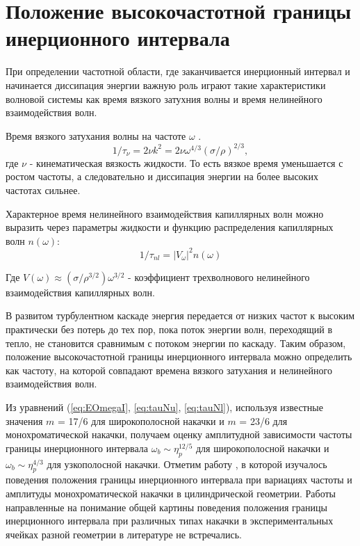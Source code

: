 \section{Положение высокочастотной границы инерционного интервала}\label{subsect_hiFreqBound}

При определении частотной области, где заканчивается инерционный интервал и начинается диссипация энергии важную роль играют такие характеристики волновой системы как время вязкого затухния волны и время нелинейного взаимодействия волн.

Время вязкого затухания волны на частоте $\omega$ \cite[стр. 135]{land}.
\begin{equation}
\label{eq:tauNu}
1/\tau_\nu = 2\nu k^2 = 2 \nu \omega^{4/3}(\sigma/\rho)^{2/3},
\end{equation}
где $\nu$ - кинематическая вязкость жидкости.
То есть вязкое время уменьшается с ростом частоты, а следовательно и диссипация энергии на более высоких частотах сильнее.


Характерное время нелинейного взаимодействия капиллярных волн можно выразить через параметры жидкости и функцию распределения капиллярных волн $n(\omega)$:
\begin{equation}
\label{eq:tauNl}
1/\tau_{nl} = |V_\omega|^2 n(\omega)
\end{equation}

Где $V(\omega) \approx (\sigma/\rho^{3/2})\omega^{3/2}$ - коэффициент трехволнового нелинейного взаимодействия капиллярных волн.

В развитом турбулентном каскаде энергия передается от низких частот к высоким практически без потерь до тех пор, пока поток энергии волн, переходящий в тепло, не становится сравнимым с потоком энергии по каскаду. Таким образом, положение высокочастотной границы инерционного интервала можно определить как частоту, на которой совпадают времена вязкого затухания и нелинейного взаимодействия волн.

Из уравнений (\ref{eq:EOmegaI}, \ref{eq:tauNu}, \ref{eq:tauNl}), используя известные значения $m$ = 17/6 для широкополосной накачки и $m$ = 23/6 для монохроматической накачки, получаем оценку амплитудной зависимости частоты границы инерционного интервала $\omega_b \sim \eta_p^{12/5}$ для широкополосной накачки и $\omega_b \sim \eta_p^{4/3}$ для узкополосной накачки. Отметим работу \cite{Brazhnikov_bound_freq}, в которой изучалось поведения положения границы инерционного интервала при вариациях частоты и амплитуды монохроматической накачки в цилиндрической геометрии. Работы направленные на понимание общей картины поведения положения границы инерционного интервала при различных типах накачки в экспериментальных ячейках разной геометрии в литературе не встречались.

